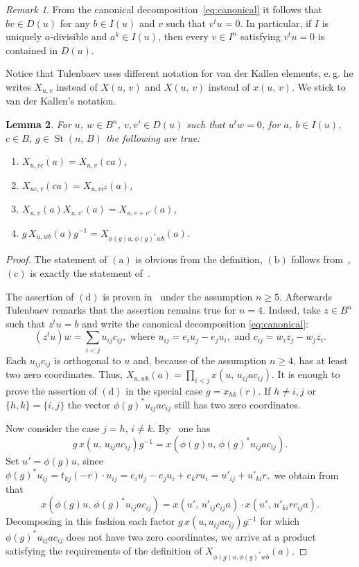 \documentclass[11pt]{amsart}
\theoremstyle{plain} \declaretheorem[name=Theorem, Refname={Theorem,Theorems}]{tm} \Crefname{tm}{Theorem}{Theorems}
\numberwithin{equation}{section}
\newtheorem{lm}{Lemma} \numberwithin{lm}{section} \Crefname{lm}{Lemma}{Lemmas}
\theoremstyle{definition} \newtheorem{df}[lm]{Definition} \Crefname{df}{Definition}{Definitions}
\theoremstyle{remark} \newtheorem{rk}[lm]{Remark} \Crefname{rk}{Remark}{Remarks}
\newcommand{\St}{\mathop{\mathrm{St}}\nolimits}
\newcommand{\inv}{^{-1}}
\begin{document}
\begin{rk} \label{rk:ID}
From the canonical decomposition~\eqref{eq:canonical} it follows that $bv\in D(u)$ for any $b\in I(u)$ and $v$ such that $v^tu=0$.
In particular, if $I$ is uniquely $a$-divisible and $a^k\in I(u)$, then every $v\in I^n$ satisfying $v^tu=0$ is contained in $D(u)$.
\end{rk}

Notice that Tulenbaev uses different notation for van der Kallen elements, e.\,g. he writes $X_{u,v}$ instead of $X(u,\,v)$ and $X(u,\,v)$ instead of $x(u,\,v)$. 
We stick to van der Kallen's notation.

\begin{lm} \label{xproperties}
For $u$, $w\in B^n$, $v, v' \in D(u)$ such that $u^tw=0$, for $a$, $b\in I(u)$, $c\in B$, $g\in\St(n,\,B)$ the following are true:
\begin{enumerate}
\item $X_{u,vc}(a)=X_{u,v}(ca)$,
\item $X_{uc,v}(ca)=X_{u,vc^2}(a)$,
\item $X_{u,v}(a)X_{u,v'}(a)=X_{u,v+v'}(a)$,
\item $g\,X_{u,wb}(a)g\inv=X_{\phi(g)u,\phi(g)^*wb}(a)$.
\end{enumerate}
\end{lm}

\begin{proof}
The statement of $(\mathrm a)$ is obvious from the definition, $(\mathrm b)$ follows from~\cite[Lemma~1.1\,d)]{Tul}, $(\mathrm c)$ is exactly the statement of~\cite[Lemma~1.3\,a)]{Tul}.

The assertion of $(\mathrm d)$ is proven in~\cite[Lemma~1.3\,b)]{Tul} under the assumption $n\geq5$. 
Afterwards Tulenbaev remarks that the assertion remains true for $n=4$. %
Indeed, take $z\in B^n$ such that $z^tu=b$ and write the canonical decomposition \eqref{eq:canonical}:
$$(z^tu)w=\sum_{i<j}u_{ij} c_{ij}, \text{ where } u_{ij}=e_iu_j-e_ju_i,\text{ and }c_{ij}=w_iz_j-w_jz_i.$$
Each $u_{ij} c_{ij}$ is orthogonal to $u$ and, because of the assumption $n\geq4$, has at least two zero coordinates.
Thus, $X_{u,wb}(a)=\prod_{i<j}x(u,\, u_{ij} ac_{ij})$. 
It is enough to prove the assertion of $(\mathrm d)$ in the special case $g=x_{hk}(r)$.
If $h\neq i,j$ or $\{h,k\}=\{i,j\}$ the vector $\phi(g)^*u_{ij}ac_{ij}$ still has two zero coordinates.

Now consider the case $j=h$, $i\neq k$. 
By~\cite[3.12]{vdK} one has $$g\,x(u,\,u_{ij}ac_{ij})g\inv=x(\phi(g)u,\,\phi(g)^*u_{ij}ac_{ij}).$$
Set $u' = \phi(g)u$, since
$\phi(g)^*u_{ij} = t_{kj}(-r) \cdot u_{ij} = e_iu_j - e_ju_i + e_kru_i =u'_{ij}+u'_{ki}r,$ 
we obtain from~\cite[3.11]{vdK} that
$$x(\phi(g)u,\,\phi(g)^* u_{ij} ac_{ij})=x\left(u',\,u'_{ij}c_{ij}a\right)\cdot x\left(u',\,u'_{ki} rc_{ij}a\right).$$
Decomposing in this fashion each factor $g\,x(u,u_{ij}ac_{ij})g^{-1}$ for which $\phi(g)^*u_{ij}ac_{ij}$ does not have two zero coordinates, 
 we arrive at a product satisfying the requirements of the definition of $X_{\phi(g)u,\phi(g)^*wb}(a)$. \end{proof}
\end{document}
